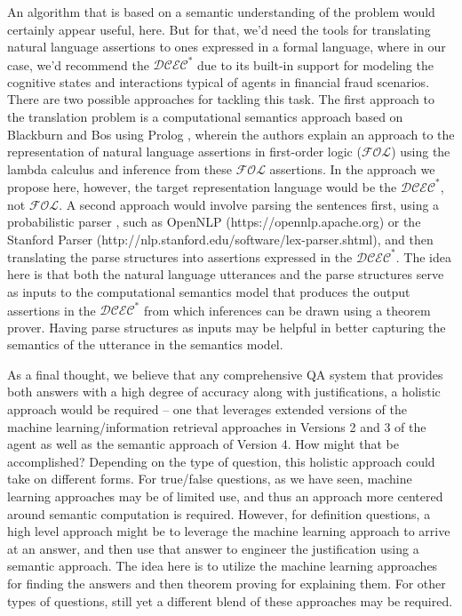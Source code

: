An algorithm that is based on a semantic understanding of the problem would certainly appear useful, here. But for that, we'd need the tools for translating natural language assertions to ones expressed in a formal language, where in our case, we'd recommend the $\mathcal{DCEC}^\ast$ due to its built-in support for modeling the cognitive states and interactions typical of agents in financial fraud scenarios. There are two possible approaches for tackling this task. The first approach to the translation problem is a computational semantics approach based on Blackburn and Bos \cite{blackburn_2005_representation_ch1, blackburn_2005_representation_ch2, blackburn_2005_representation_ch3, blackburn_2005_representation_ch4, blackburn_2005_representation_ch5, blackburn_2005_representation_ch6} using Prolog \cite{
blackburn_2006_prolog_ch7,
blackburn_2006_prolog_ch8,
blackburn_2006_prolog_ch9,
blackburn_2006_prolog_ch10,
blackburn_2006_prolog_ch11,
blackburn_2006_prolog_ch12}, wherein the authors explain an approach to the representation of natural language assertions in first-order logic ($\mathcal{FOL}$) \cite{blackburn_2005_representation_ch1} using the lambda calculus \cite{blackburn_2005_representation_ch2} and inference \cite{blackburn_2005_representation_ch4, blackburn_2005_representation_ch5} from these $\mathcal{FOL}$ assertions. In the approach we propose here, however, the target representation language would be the $\mathcal{DCEC}^\ast$, not $\mathcal{FOL}$.  A second approach would involve parsing the sentences first, using a probabilistic parser \cite{martin_2000_speech_ch14}, such as OpenNLP (https://opennlp.apache.org) or the Stanford Parser (http://nlp.stanford.edu/software/lex-parser.shtml), and then translating the parse structures into assertions expressed in the $\mathcal{DCEC}^\ast$.  The idea here is that both the natural language utterances and the parse structures serve as inputs to the computational semantics model that produces the output assertions in the $\mathcal{DCEC}^\ast$ from which inferences can be drawn using a theorem prover.  Having parse structures as inputs may be helpful in better capturing the semantics of the utterance in the semantics model. 

As a final thought, we believe that any comprehensive QA system that provides both answers with a high degree of accuracy along with justifications, a holistic approach would be required – one that leverages extended versions of the machine learning/information retrieval approaches in Versions 2 and 3 of the agent as well as the semantic approach of Version 4. How might that be accomplished? Depending on the type of question, this holistic approach could take on different forms. For true/false questions, as we have seen, machine learning approaches may be of limited use, and thus an approach more centered around semantic computation is required.  However, for definition questions, a high level approach might be to leverage the machine learning approach to arrive at an answer, and then use that answer to engineer the justification using a semantic approach.  The idea here is to utilize the machine learning approaches for finding the answers and then theorem proving for explaining them. For other types of questions, still yet a different blend of these approaches may be required.